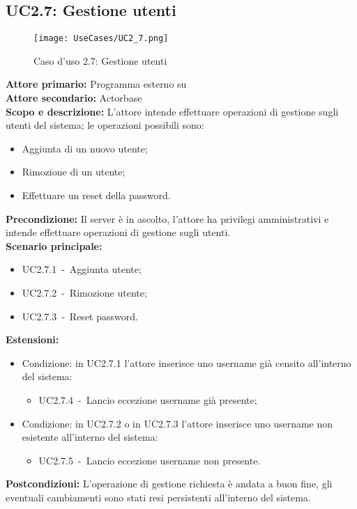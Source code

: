 \documentclass{scalatekids-article}
\begin{document}
\subsection{UC2.7: Gestione utenti}

\begin{figure}[H]
  \begin{center}
    \texttt{[image: UseCases/UC2\_7.png]}
    \caption{Caso d'uso 2.7: Gestione utenti}
  \end{center}
\end{figure}
\textbf{Attore primario:} Programma esterno su \\
\textbf{Attore secondario:} Actorbase\\
\textbf{Scopo e descrizione:} L'attore intende effettuare operazioni di gestione sugli utenti del sistema; le operazioni possibili sono:
\begin{itemize}
\item Aggiunta di un nuovo utente;
\item Rimozione di un utente;
\item Effettuare un reset della password.
\end{itemize}
\textbf{Precondizione:} Il server è in ascolto, l'attore ha privilegi amministrativi e intende effettuare operazioni di gestione sugli utenti.\\
\textbf{Scenario principale:}
\begin{itemize}
\item UC2.7.1\ -\ Aggiunta utente;
\item UC2.7.2\ -\ Rimozione utente;
\item UC2.7.3\ -\ Reset password.
\end{itemize}
\textbf{Estensioni:}
\begin{itemize}
\item Condizione: in UC2.7.1 l'attore inserisce uno username già censito all'interno del sistema:
  \begin{itemize}
  \item UC2.7.4\ -\ Lancio eccezione username già presente;
  \end{itemize}
\item Condizione: in UC2.7.2 o in UC2.7.3 l'attore inserisce uno username non esistente all'interno del sistema:
  \begin{itemize}
  \item UC2.7.5\ -\ Lancio eccezione username non presente.
  \end{itemize}
\end{itemize}
\textbf{Postcondizioni:} L'operazione di gestione richiesta è andata a buon fine, gli eventuali cambiamenti sono stati resi persistenti all'interno del sistema.
\end{document}
